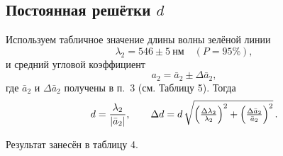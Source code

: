 \subsection{Постоянная решётки \(d\)}

Используем табличное значение длины волны зелёной линии
\[
	\lambda_2 = 546 \pm 5\ \text{нм}\quad(P=95\%),
\]
и средний угловой коэффициент
\[
	a_2 = \bar a_2 \pm \Delta\bar a_2,
\]
где \(\bar a_2\) и \(\Delta\bar a_2\) получены в п.~3 (см. Таблицу 5).
Тогда
\[
	d = \frac{\lambda_2}{\lvert \bar a_2\rvert},
	\qquad
	\Delta d = d \,
	\sqrt{\Bigl(\tfrac{\Delta \lambda_2}{\lambda_2}\Bigr)^2
		+\Bigl(\tfrac{\Delta \bar a_2}{\bar a_2}\Bigr)^2}\,.
\]

Результат занесён в таблицу 4.
